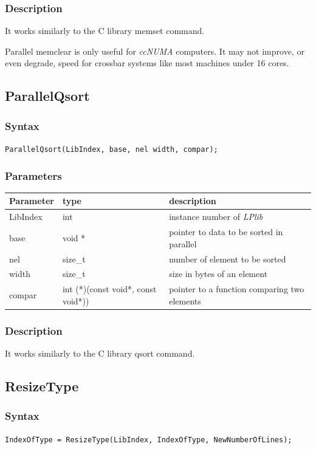 \documentclass[a4paper,12pt]{article}
\begin{document}
\subsubsection*{Description}
It works similarly to the C library memset command.

Parallel memclear is only useful for \emph{ccNUMA} computers. It may not improve, or even degrade, speed for crossbar systems like most machines under 16 cores.


\subsection{ParallelQsort}

\subsubsection*{Syntax}
\tt{ParallelQsort(LibIndex, base, nel width, compar);}
\normalfont

\subsubsection*{Parameters}
\begin{tabular}{|m{2cm}|m{4cm}|m{8cm}|}
\hline
Parameter  & type   & description \\
\hline
LibIndex   & int    & instance number of \emph{LPlib} \\
\hline
base       & void * & pointer to data to be sorted in parallel \\
\hline
nel        & size\_t & number of element to be sorted \\
\hline
width      & size\_t & size in bytes of an element \\
\hline
compar     & int (*)(const void*, const void*)) & pointer to a function comparing two elements \\
\hline
\end{tabular}

\subsubsection*{Description}
It works similarly to the C library qsort command.


\subsection{ResizeType}

\subsubsection*{Syntax}
\tt{IndexOfType = ResizeType(LibIndex, IndexOfType, NewNumberOfLines);}
\normalfont
\end{document}
